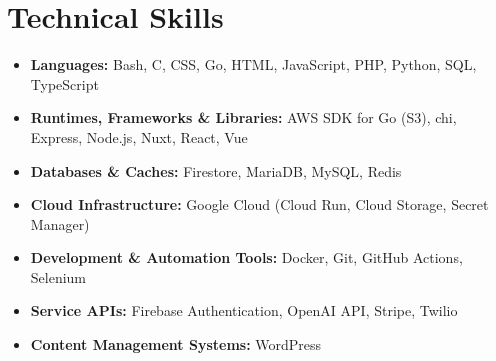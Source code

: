 \documentclass[letterpaper,11pt]{article}
\begin{document}
\section{Technical Skills}
\begin{itemize}[leftmargin=0in, label={}, itemsep=0pt, topsep=2pt, parsep=0pt]
    \small
    \item \textbf{Languages:} Bash, C, CSS, Go, HTML, JavaScript, PHP, Python, SQL, TypeScript
    \item \textbf{Runtimes, Frameworks \& Libraries:} AWS SDK for Go (S3), chi, Express, Node.js, Nuxt, React, Vue
    \item \textbf{Databases \& Caches:} Firestore, MariaDB, MySQL, Redis
    \item \textbf{Cloud Infrastructure:} Google Cloud (Cloud Run, Cloud Storage, Secret Manager)
    \item \textbf{Development \& Automation Tools:} Docker, Git, GitHub Actions, Selenium
    \item \textbf{Service APIs:} Firebase Authentication, OpenAI API, Stripe, Twilio
    \item \textbf{Content Management Systems:} WordPress
\end{itemize}
\end{document}
